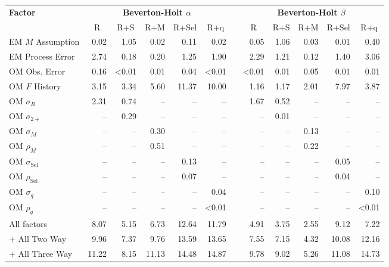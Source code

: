 \begin{center}
\begin{tabular}{lrrrrrcrrrrr}
\hline\hline
\multicolumn{1}{l}{\bfseries Factor}&\multicolumn{5}{c}{\bfseries Beverton-Holt $\alpha$}&\multicolumn{1}{c}{\bfseries }&\multicolumn{5}{c}{\bfseries Beverton-Holt $\beta$}\tabularnewline
\cline{2-6} \cline{8-12}
\multicolumn{1}{l}{}&\multicolumn{1}{c}{R}&\multicolumn{1}{c}{R+S}&\multicolumn{1}{c}{R+M}&\multicolumn{1}{c}{R+Sel}&\multicolumn{1}{c}{R+q}&\multicolumn{1}{c}{}&\multicolumn{1}{c}{R}&\multicolumn{1}{c}{R+S}&\multicolumn{1}{c}{R+M}&\multicolumn{1}{c}{R+Sel}&\multicolumn{1}{c}{R+q}\tabularnewline
\hline
EM $M$ Assumption& 0.02& 1.05& 0.02& 0.11& 0.02&& 0.05& 1.06& 0.03& 0.01& 0.40\tabularnewline
EM Process Error& 2.74& 0.18& 0.20& 1.25& 1.90&& 2.29& 1.21& 0.12& 1.40& 3.06\tabularnewline
OM Obs. Error& 0.16&\textless  0.01& 0.01& 0.04&\textless  0.01&&\textless  0.01& 0.01& 0.05& 0.01& 0.01\tabularnewline
OM $F$ History& 3.15& 3.34& 5.60&11.37&10.00&& 1.16& 1.17& 2.01& 7.97& 3.87\tabularnewline
OM $\sigma_R$& 2.31& 0.74&--&--&--&& 1.67& 0.52&--&--&--\tabularnewline
OM $\sigma_{2+}$ &--& 0.29&--&--&--&&--& 0.01&--&--&--\tabularnewline
OM $\sigma_M$&--&--& 0.30&--&--&&--&--& 0.13&--&--\tabularnewline
OM $\rho_M$&--&--& 0.51&--&--&&--&--& 0.22&--&--\tabularnewline
OM $\sigma_{\text{Sel}}$&--&--&--& 0.13&--&&--&--&--& 0.05&--\tabularnewline
OM $\rho_{\text{Sel}}$&--&--&--& 0.07&--&&--&--&--& 0.04&--\tabularnewline
OM $\sigma_q$&--&--&--&--& 0.04&&--&--&--&--& 0.10\tabularnewline
OM $\rho_q$&--&--&--&--&\textless  0.01&&--&--&--&--&\textless  0.01\tabularnewline
All factors& 8.07& 5.15& 6.73&12.64&11.79&& 4.91& 3.75& 2.55& 9.12& 7.22\tabularnewline
+ All Two Way& 9.96& 7.37& 9.76&13.59&13.65&& 7.55& 7.15& 4.32&10.08&12.16\tabularnewline
+ All Three Way&11.22& 8.15&11.13&14.48&14.87&& 9.78& 9.02& 5.26&11.08&14.73\tabularnewline
\hline
\end{tabular}\end{center}

